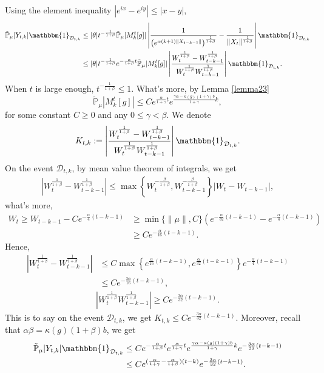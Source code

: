 \documentclass{article}
\begin{document}
    Using the element inequality $|e^{ix}-e^{iy}|\leq|x-y|$,
    \begin{align*}
        \mathbb{\tilde{P}}_{\mu}|Y_{t,k}|\mathbbm{1}_{\mathcal{D}_{t,k}}&\leq|\theta|t^{-\frac{1}{1+\beta}}\mathbb{\tilde{P}}_{\mu}|M_k^t[g]|\left|\frac{1}{\left(e^{\alpha(k+1)\|X_{t-k-1}\|}\right)^{\frac{1}{1+\beta}}}-\frac{1}{\|X_t\|^{\frac{1}{1+\beta}}}\right|\mathbbm{1}_{\mathcal{D}_{t,k}}\\
        &\leq|\theta|t^{-\frac{1}{1+\beta}}e^{-\frac{\alpha}{1+\beta}t}\mathbb{\tilde{P}}_{\mu}|M_k^t[g]|\left|\frac{W_t^{\frac{1}{1+\beta}}-W_{t-k-1}^{\frac{1}{1+\beta}}}{W_t^{\frac{1}{1+\beta}}W_{t-k-1}^{\frac{1}{1+\beta}}}\right|\mathbbm{1}_{\mathcal{D}_{t,k}}.
    \end{align*}
    When $t$ is large enough, $t^{-\frac{1}{1+\beta}}\leq 1$. What's more, by Lemma \ref{lemma23}
    $$\mathbb{\tilde{P}}_{\mu}|M_k^t[g]|\leq C e^{\frac{\alpha}{1+\gamma}t}e^{\frac{\gamma \alpha-\kappa(g)(1+\gamma)b}{1+\gamma}k},$$
for some constant $C \geq 0$ and any $0\leq\gamma<\beta$.
We denote
$$K_{t,k}:=\left|\frac{W_t^{\frac{1}{1+\beta}}-W_{t-k-1}^{\frac{1}{1+\beta}}}{W_t^{\frac{1}{1+\beta}}W_{t-k-1}^{\frac{1}{1+\beta}}}\right|\mathbbm{1}_{\mathcal{D}_{t,k}}.$$
 On the event $\mathcal{D}_{t,k}$, by mean value theorem of integrals, we get
 \begin{align*}
     \left|W_t^{\frac{1}{1+\beta}}-W_{t-k-1}^{\frac{1}{1+\beta}}\right|\leq \max \left\{W_t^{-\frac{\beta}{1+\beta}},W_{t-k-1}^{-\frac{\beta}{1+\beta}}\right\}\left|W_t-W_{t-k-1}\right|,
 \end{align*}
 what's more, 
 \begin{align*}
     W_t\geq W_{t-k-1}-C e^{-\frac{\alpha}{4}(t-k-1)}&\geq\min\{\|\mu\|,C\}\left(e^{-\frac{\alpha}{32}(t-k-1)}-e^{-\frac{\alpha}{4}(t-k-1)}\right)\\
     &\geq C e^{-\frac{\alpha}{16}(t-k-1)}.
 \end{align*}
Hence, 
\begin{align*}
    \left|W_t^{\frac{1}{1+\beta}}-W_{t-k-1}^{\frac{1}{1+\beta}}\right|&\leq C \max\left\{e^{\frac{\alpha}{16}(t-k-1)}, e^{\frac{\alpha}{32}(t-k-1)}\right\}e^{-\frac{\alpha}{4}(t-k-1)}\\
    &\leq C e^{-\frac{3\alpha}{16}(t-k-1)},
\end{align*}
\begin{align*}
    \left|W_t^{\frac{1}{1+\beta}}W_{t-k-1}^{\frac{1}{1+\beta}}\right|\geq C e^{-\frac{3\alpha}{32}(t-k-1)}.
\end{align*}
This is to say on the event $\mathcal{D}_{t,k}$, we get $K_{t,k}\leq C e^{-\frac{3\alpha}{32}(t-k-1)}$. Moreover, recall that $\alpha\beta=\kappa(g)(1+\beta)b$, we get
\begin{align}
    \mathbb{\tilde{P}}_{\mu}|Y_{t,k}|\mathbbm{1}_{\mathcal{D}_{t,k}}&\leq C e^{-\frac{\alpha}{1+\beta}t}e^{\frac{\alpha}{1+\gamma}t}e^{\frac{\gamma \alpha-\kappa(g)(1+\gamma)b}{1+\gamma}k}e^{-\frac{3\alpha}{32}(t-k-1)}\label{thm125}\\
    &\leq C e^{(\frac{\alpha}{1+\gamma}-\frac{\alpha}{1+\beta})(t-k)}e^{-\frac{3\alpha}{32}(t-k-1)}.\nonumber
\end{align}
\end{document}
